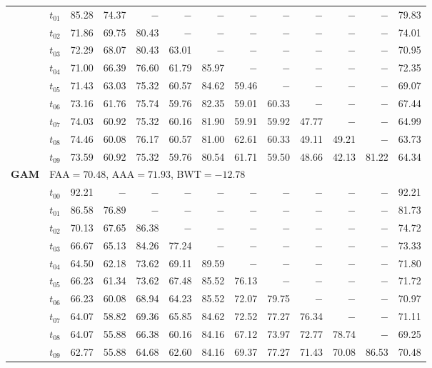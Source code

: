 \begin{table}[ht]
\begin{tabular}{@{}l l r r r r r r r r r r r@{}}
 & $t_{01}$ & 85.28 & 74.37 & $-$ & $-$ & $-$ & $-$ & $-$ & $-$ & $-$ & $-$ & 79.83 \\
 & $t_{02}$ & 71.86 & 69.75 & 80.43 & $-$ & $-$ & $-$ & $-$ & $-$ & $-$ & $-$ & 74.01 \\
 & $t_{03}$ & 72.29 & 68.07 & 80.43 & 63.01 & $-$ & $-$ & $-$ & $-$ & $-$ & $-$ & 70.95 \\
 & $t_{04}$ & 71.00 & 66.39 & 76.60 & 61.79 & 85.97 & $-$ & $-$ & $-$ & $-$ & $-$ & 72.35 \\
 & $t_{05}$ & 71.43 & 63.03 & 75.32 & 60.57 & 84.62 & 59.46 & $-$ & $-$ & $-$ & $-$ & 69.07 \\
 & $t_{06}$ & 73.16 & 61.76 & 75.74 & 59.76 & 82.35 & 59.01 & 60.33 & $-$ & $-$ & $-$ & 67.44 \\
 & $t_{07}$ & 74.03 & 60.92 & 75.32 & 60.16 & 81.90 & 59.91 & 59.92 & 47.77 & $-$ & $-$ & 64.99 \\
 & $t_{08}$ & 74.46 & 60.08 & 76.17 & 60.57 & 81.00 & 62.61 & 60.33 & 49.11 & 49.21 & $-$ & 63.73 \\
 & $t_{09}$ & 73.59 & 60.92 & 75.32 & 59.76 & 80.54 & 61.71 & 59.50 & 48.66 & 42.13 & 81.22 & 64.34 \\
\midrule
\multirow{11}{*}{\textbf{GAM}} & \multicolumn{12}{l}{\quad\small FAA$=70.48$,\; AAA$=71.93$,\; BWT$=-12.78$} \\
 & $t_{00}$ & 92.21 & $-$ & $-$ & $-$ & $-$ & $-$ & $-$ & $-$ & $-$ & $-$ & 92.21 \\
 & $t_{01}$ & 86.58 & 76.89 & $-$ & $-$ & $-$ & $-$ & $-$ & $-$ & $-$ & $-$ & 81.73 \\
 & $t_{02}$ & 70.13 & 67.65 & 86.38 & $-$ & $-$ & $-$ & $-$ & $-$ & $-$ & $-$ & 74.72 \\
 & $t_{03}$ & 66.67 & 65.13 & 84.26 & 77.24 & $-$ & $-$ & $-$ & $-$ & $-$ & $-$ & 73.33 \\
 & $t_{04}$ & 64.50 & 62.18 & 73.62 & 69.11 & 89.59 & $-$ & $-$ & $-$ & $-$ & $-$ & 71.80 \\
 & $t_{05}$ & 66.23 & 61.34 & 73.62 & 67.48 & 85.52 & 76.13 & $-$ & $-$ & $-$ & $-$ & 71.72 \\
 & $t_{06}$ & 66.23 & 60.08 & 68.94 & 64.23 & 85.52 & 72.07 & 79.75 & $-$ & $-$ & $-$ & 70.97 \\
 & $t_{07}$ & 64.07 & 58.82 & 69.36 & 65.85 & 84.62 & 72.52 & 77.27 & 76.34 & $-$ & $-$ & 71.11 \\
 & $t_{08}$ & 64.07 & 55.88 & 66.38 & 60.16 & 84.16 & 67.12 & 73.97 & 72.77 & 78.74 & $-$ & 69.25 \\
 & $t_{09}$ & 62.77 & 55.88 & 64.68 & 62.60 & 84.16 & 69.37 & 77.27 & 71.43 & 70.08 & 86.53 & 70.48 \\

\end{tabular}
\end{table}
